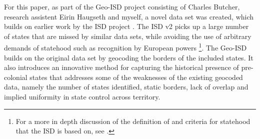 \documentclass[12pt]{article}
\begin{document}
For this paper, as part of the Geo-ISD project consisting of Charles Butcher,
research assistent Eirin Haugseth and myself, a novel data set was created,
which builds on earlier work by the ISD project \citep{Butcher2020}. The ISD v2
picks up a large number of states that are missed by similar data sets, while
avoiding the use of arbitrary demands of statehood such as recognition by
European powers \citep{Butcher2020}\footnote{For a more in depth discussion of
	the definition of and criteria for statehood that the ISD is based on,
see \citet{Butcher2017}.}. The Geo-ISD builds on the original data set by
geocoding the borders of the included states. It also introduces an innovative
method for capturing the historical presence of pre-colonial states that
addresses some of the weaknesses of the existing geocoded data, namely the
number of states identified, static borders, lack of overlap and implied
uniformity in state control across territory.
\end{document}
